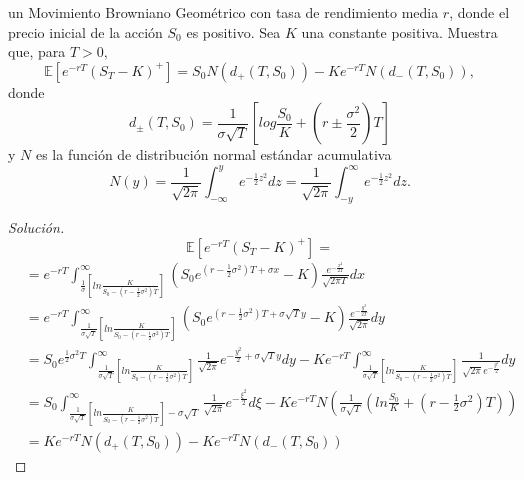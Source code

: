 \documentclass[11pt,notitlepage]{article}
\newenvironment{solucion}
  {\begin{proof}[Solución]}
  {\end{proof}}
\begin{document}
\hspace{0.3cm} un Movimiento Browniano Geométrico con tasa de rendimiento media $r$, donde el precio inicial de la acción $S_0$ es positivo. Sea $K$ una constante positiva. Muestra que, para $T>0$,
\begin{equation*}
    \mathbb{E}\left[ e^{-rT}(S_T-K)^{+}\right]=S_0N(d_{+}(T,S_0))-Ke^{-rT}N(d_{-}(T,S_0)),
\end{equation*}
\hspace{0.3cm} donde
\begin{equation*}
    d_{\pm}(T,S_0)=\frac{1}{\sigma\sqrt{T}}\left[ log\frac{S_0}{K}+\left( r \pm \frac{\sigma^{2}}{2}\right)T \right]
\end{equation*}
\hspace{0.3cm} y $N$ es la función de distribución normal estándar acumulativa
\begin{equation*}
    N(y)=\frac{1}{\sqrt{2\pi}}\int_{-\infty}^{y}e^{-\frac{1}{2}z^{2}}dz=\frac{1}{\sqrt{2\pi}}\int_{-y}^{\infty}e^{-\frac{1}{2}z^{2}}dz.
\end{equation*}
\begin{solucion}
 \begin{equation*}
     \mathbb{E}[e^{-rT}(S_{T}-K)^{+}]=
 \end{equation*}
 \begin{align*}
     &=e^{-rT}\int_{\frac{1}{\sigma}\left[ln\frac{K}{S_{0}-(r-\frac{1}{2}\sigma^{2})T}\right]}^{\infty}\left(S_{0}e^{(r-\frac{1}{2}\sigma^2)T+\sigma x}-K\right)\frac{e^{-\frac{x^{2}}{2T}}}{\sqrt{2\pi T}}dx\\
     &=e^{-rT}\int_{\frac{1}{\sigma\sqrt{T}}\left[ln\frac{K}{S_{0}-(r-\frac{1}{2}\sigma^{2})T}\right]}^{\infty}\left(S_{0}e^{(r-\frac{1}{2}\sigma^2)T+\sigma \sqrt{T}y}-K\right)\frac{e^{-\frac{y^{2}}{2T}}}{\sqrt{2\pi}}dy\\
     &=S_{0}e^{\frac{1}{2}\sigma^2T}\int_{\frac{1}{\sigma\sqrt{T}}\left[ln\frac{K}{S_{0}-(r-\frac{1}{2}\sigma^{2})T}\right]}^{\infty}\frac{1}{\sqrt{2\pi}}e^{-\frac{y^{2}}{2}+\sigma\sqrt{T}y}dy-Ke^{-rT}\int_{\frac{1}{\sigma\sqrt{T}}\left[ln\frac{K}{S_{0}-(r-\frac{1}{2}\sigma^{2})T}\right]}^{\infty}\frac{1}{\sqrt{2\pi}e^{-\frac{y^2}{2}}}dy \\
     &=S_{0}\int_{\frac{1}{\sigma\sqrt{T}}\left[ln\frac{K}{S_{0}-(r-\frac{1}{2}\sigma^{2})T}\right]-\sigma\sqrt{T}}^{\infty}\frac{1}{\sqrt{2\pi}}e^{-\frac{\xi^{2}}{2}}d\xi-Ke^{-rT}N\left( \frac{1}{\sigma\sqrt{T}}\left(ln\frac{S_{0}}{K}+(r-\frac{1}{2}\sigma^{2})T \right)\right)\\
     &=Ke^{-rT}N(d_{+}(T,S_{0}))-Ke^{-rT}N(d_{-}(T,S_{0}))
 \end{align*}
\end{solucion}
\end{document}
